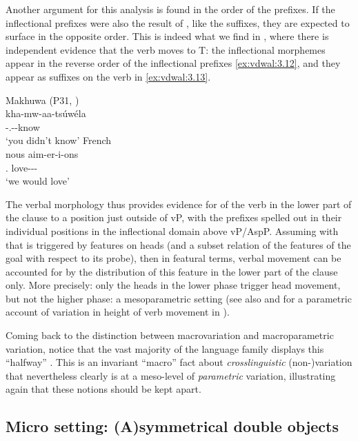 \documentclass[output=paper]{langsci/langscibook}
\begin{document}
Another argument for this analysis is found in the order of the prefixes. If
the inflectional prefixes were also the result of , like the
suffixes, they are expected to surface in the opposite order. This is indeed
what we find in , where there is independent evidence that the verb moves
to T: the inflectional morphemes appear in the reverse order of the 
inflectional prefixes \eqref{ex:vdwal:3.12}, and they appear as suffixes on the verb
in \eqref{ex:vdwal:3.13}.

\ea\label{ex:vdwal:3.12} Makhuwa (P31, )\\
    \gll kha-mw-aa-tsúwéla\\
        \Neg{}-\Spl.\Sm{}-\Ipfv{}-know\\
    \glt ‘you didn't know’
\ex\label{ex:vdwal:3.13} French\\
    \gll  nous  aim-er-i-ons\\
          \Fsg{}.\Pron{}  love-\Irr{}-\Pst{}-\Fsg{}\\
    \glt  ‘we would love’
\z

The verbal morphology thus provides evidence for  of the
verb in the lower part of the clause to a position just outside of vP, with the
prefixes spelled out in their individual positions in the inflectional domain
above vP/AspP. Assuming with \citet{Roberts2010} that  is
triggered by features on heads (and a subset relation of the features of the
goal with respect to its probe), then in featural terms,  verbal
movement can be accounted for by the distribution of this
feature in the lower part of the clause only. More precisely: only the heads in
the lower phase trigger head movement, but not the higher phase: a
mesoparametric setting (see also \citealt{Ledgeway2013} and
\citealt{Schifano2015} for a parametric account of variation in height of verb
movement in ).

Coming back to the distinction between macrovariation and macroparametric
variation, notice that the vast majority of the language family displays this
“halfway” . This is an invariant “macro” fact about 
\emph{crosslinguistic} (non-)variation that nevertheless clearly is at a
meso-level of \emph{parametric} variation, illustrating again that these
notions should be kept apart.

\subsection{Micro setting: (A)symmetrical double objects}\label{sub:3.2.3}
\end{document}
